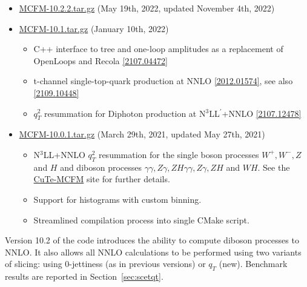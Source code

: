\label{MCFM10download}
\begin{itemize}
\item \href{https://mcfm.fnal.gov/downloads/MCFM-10.2.2.tar.gz}{MCFM-10.2.2.tar.gz} (May 19th, 2022, updated November 4th, 2022)

\item \href{https://mcfm.fnal.gov/downloads/MCFM-10.1.tar.gz}{MCFM-10.1.tar.gz} (January 10th, 2022)

\begin{itemize}
\item C++ interface to tree and one-loop amplitudes as a replacement of OpenLoops and Recola \href{https://arxiv.org/abs/2107.04472}{[2107.04472]}
\item t-channel single-top-quark production at NNLO \href{https://arxiv.org/abs/2012.01574}{[2012.01574]},
see also \href{https://arxiv.org/abs/2109.10448}{[2109.10448]}
\item $q_T^2$ resummation for Diphoton production at N$^3$LL$^\prime$+NNLO \href{https://arxiv.org/abs/2107.12478}{[2107.12478]}
\end{itemize}

\item \href{https://mcfm.fnal.gov/downloads/MCFM-10.0.1.tar.gz}{MCFM-10.0.1.tar.gz} (March 29th, 2021, updated May 27th, 2021)

\begin{itemize}
\item N$^3$LL+NNLO $q_T^2$ resummation for the single boson processes $W^+,W^-,Z$ and $H$
and diboson processes $\gamma\gamma,Z\gamma,ZH\gamma\gamma,Z\gamma,ZH$ and $WH$.
See the \href{https://mcfm.fnal.gov/downloads/cute-mcfm.html}{CuTe-MCFM} site for further details.
\item Support for histograms with custom binning.
\item Streamlined compilation process into single CMake script.
\end{itemize}
\end{itemize}

\label{sec:10x2}

Version 10.2 of the code introduces the ability to compute diboson processes
to NNLO.  It also allows all NNLO calculations to be performed using two
variants of slicing: using 0-jettiness (as in previous versions) or $q_T$ (new).
Benchmark results are reported in Section~\ref{sec:scetqt}.

